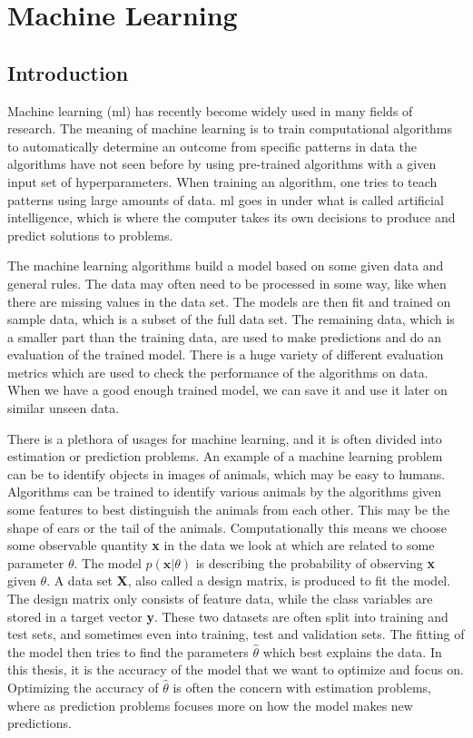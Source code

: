 \documentclass[a4paper, american, 12pt]{report}
\begin{document}
	
	\chapter{Machine Learning}
	\label{chap:Theory-Machine_learning}
	\section{Introduction}
	\label{sect:Theory-IntroML}
	Machine learning (\acrshort{ml}) has recently become widely used in many fields of research. The meaning of machine learning is to train computational algorithms to automatically determine an outcome from specific patterns in data the algorithms have not seen before by using pre-trained algorithms with a given input set of hyperparameters. When training an algorithm, one tries to teach patterns using large amounts of data. \acrshort{ml} goes in under what is called artificial intelligence, which is where the computer takes its own decisions to produce and predict solutions to problems. 
	
	The machine learning algorithms build a model based on some given data and general rules. The data may often need to be processed in some way, like when there are missing values in the data set. The models are then fit and trained on sample data, which is a subset of the full data set. The remaining data, which is a smaller part than the training data, are used to make predictions and do an evaluation of the trained model. There is a huge variety of different evaluation metrics which are used to check the performance of the algorithms on data. When we have a good enough trained model, we can save it and use it later on similar unseen data.
	
	There is a plethora of usages for machine learning, and it is often divided into estimation or prediction problems. An example of a machine learning problem can be to identify objects in images of animals, which may be easy to humans. Algorithms can be trained to identify various animals by the algorithms given some features to best distinguish the animals from each other. This may be the shape of ears or the tail of the animals. Computationally this means we choose some observable quantity \textbf{x} in the data we look at which are related to some parameter $\theta$. The model $p(\textbf{x}|\theta)$ is describing the probability of observing \textbf{x} given $\theta$. A data set \textbf{X}, also called a design matrix, is produced to fit the model. The design matrix only consists of feature data, while the class variables are stored in a target vector \textbf{y}. These two datasets are often split into training and test sets, and sometimes even into training, test and validation sets. The fitting of the model then tries to find the parameters $\hat{\theta}$ which best explains the data. In this thesis, it is the accuracy of the model that we want to optimize and focus on. Optimizing the accuracy of $\hat{\theta}$ is often the concern with estimation problems, where as prediction problems focuses more on how the model makes new predictions.
	
\end{document}

